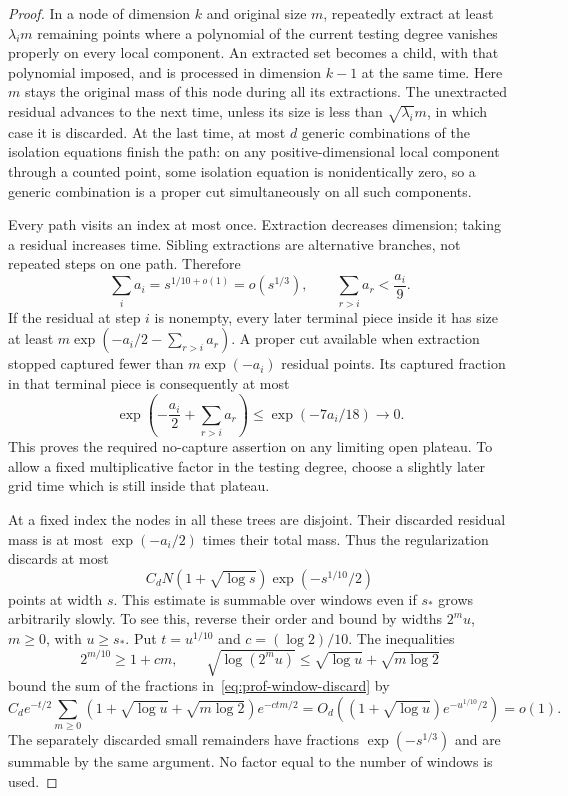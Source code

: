\begin{proof}
In a node of dimension $k$ and original size $m$, repeatedly extract at least $\lambda_i m$ remaining points where a polynomial of the current testing degree vanishes properly on every local component. An extracted set becomes a child, with that polynomial imposed, and is processed in dimension $k-1$ at the same time.  Here $m$ stays the original mass of this node during all its extractions.  The unextracted residual advances to the next time, unless its size is less than $\sqrt{\lambda_i}m$, in which case it is discarded.  At the last time, at most $d$ generic combinations of the isolation equations finish the path: on any positive-dimensional local component through a counted point, some isolation equation is nonidentically zero, so a generic combination is a proper cut simultaneously on all such components.

Every path visits an index at most once.  Extraction decreases dimension; taking a residual increases time.  Sibling extractions are alternative branches, not repeated steps on one path.  Therefore
\[
 \sum_i a_i=s^{1/10+o(1)}=o(s^{1/3}),\qquad
 \sum_{r>i}a_r<\frac{a_i}{9}.
\]
If the residual at step $i$ is nonempty, every later terminal piece inside it has size at least $m\exp(-a_i/2-\sum_{r>i}a_r)$.  A proper cut available when extraction stopped captured fewer than $m\exp(-a_i)$ residual points. Its captured fraction in that terminal piece is consequently at most
\begin{equation}\label{eq:prof-fragmentation-bound}
 \exp\left(-\frac{a_i}{2}+\sum_{r>i}a_r\right)
 \le \exp(-7a_i/18)\longrightarrow0.
\end{equation}
This proves the required no-capture assertion on any limiting open plateau.  To allow a fixed multiplicative factor in the testing degree, choose a slightly later grid time which is still inside that plateau.

At a fixed index the nodes in all these trees are disjoint.  Their discarded residual mass is at most $\exp(-a_i/2)$ times their total mass.  Thus the regularization discards at most
\begin{equation}\label{eq:prof-window-discard}
 C_d N(1+\sqrt{\log s})\exp(-s^{1/10}/2)
\end{equation}
points at width $s$.  This estimate is summable over windows even if $s_*$ grows arbitrarily slowly.  To see this, reverse their order and bound by widths $2^m u$, $m\ge0$, with $u\ge s_*$.  Put $t=u^{1/10}$ and $c=(\log2)/10$.  The inequalities
\[
 2^{m/10}\ge1+cm,\qquad
 \sqrt{\log(2^m u)}\le\sqrt{\log u}+\sqrt{m\log2}
\]
bound the sum of the fractions in~\eqref{eq:prof-window-discard} by
\[
 C_d e^{-t/2}\sum_{m\ge0}
 (1+\sqrt{\log u}+\sqrt{m\log2})e^{-ctm/2}
 =O_d((1+\sqrt{\log u})e^{-u^{1/10}/2})=o(1).
\]
The separately discarded small remainders have fractions $\exp(-s^{1/3})$ and are summable by the same argument.  No factor equal to the number of windows is used.


\end{proof}
